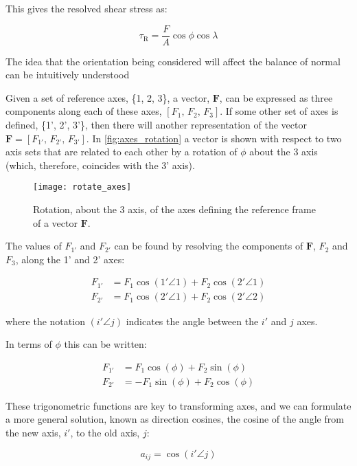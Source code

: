 This gives the resolved shear stress as:

\begin{equation}
\tau_\text{R} = \frac{F}{A} \cos \phi \cos \lambda \label{eqn:Schmid}
\end{equation}



The idea that the orientation being considered will affect the balance of normal can be intuitively understood

\FloatBarrier

Given a set of reference axes, \{1, 2, 3\}, a vector, $\mathbf{F}$, can be expressed as three components along each of these axes, $[F_1,\, F_2,\, F_3]$. If some other set of axes is defined, \{1', 2', 3'\}, then there will another representation of the vector  $\mathbf{F} = [F_{1'},\, F_{2'},\, F_{3'}]$. In \autoref{fig:axes_rotation} a vector is shown with respect to two axis sets that are related to each other by a rotation of $\phi$ about the 3 axis (which, therefore, coincides with the 3' axis).



\begin{figure}[h!]
\centering
\texttt{[image: rotate\_axes]}
\caption{Rotation, about the $3$ axis, of the axes defining the reference frame of a vector $\mathbf{F}$.\label{fig:axes_rotation}}
\end{figure}


The values of $F_{1'}$ and $F_{2'}$ can be found by resolving the components of $\mathbf{F}$, $F_2$ and $F_3$, along the 1' and 2' axes:

\begin{align}
F_{1'} &= F_1 \cos(1' \angle 1) + F_2 \cos(2' \angle 1) \nonumber\\
F_{2'} &= F_1  \cos(2' \angle 1) + F_2 \cos(2' \angle 2)
\end{align}

where the notation $(i' \angle j)$ indicates the angle between the $i'$ and $j$ axes.

In terms of $\phi$ this can be written:

\begin{align}
F_{1'} &= F_1 \cos(\phi) + F_2 \sin(\phi) \nonumber\\
F_{2'} &= - F_1  \sin(\phi) + F_2 \cos(\phi)
\end{align}

These trigonometric functions are key to transforming axes, and we can formulate a more general solution, known as direction cosines, the cosine of the angle from the new axis, $i'$, to the old axis, $j$:
\begin{annotation}
$$
a_{ij} = \cos(i' \angle j)
$$
\end{annotation}

